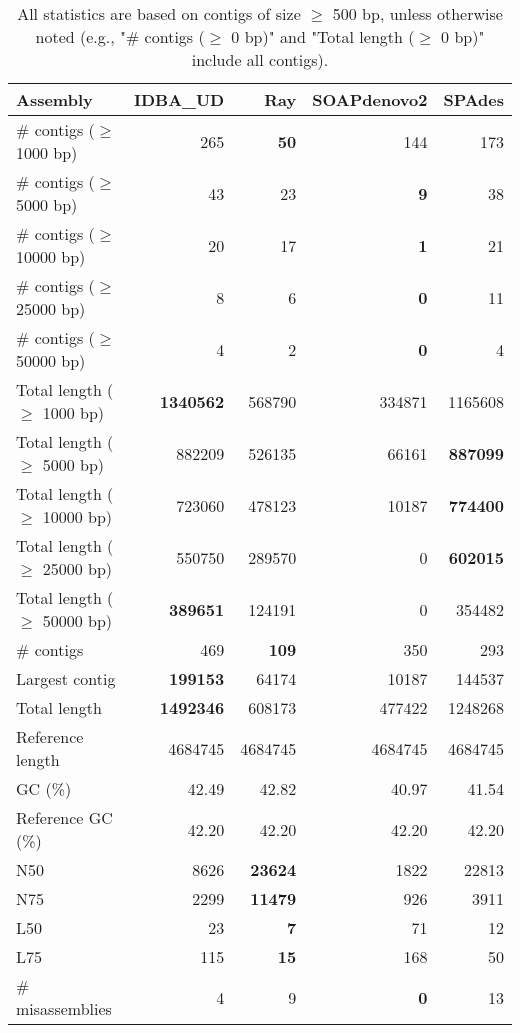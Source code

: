 \documentclass[12pt,a4paper]{article}
\begin{document}
\begin{table}[ht]
\begin{center}
\caption{All statistics are based on contigs of size $\geq$ 500 bp, unless otherwise noted (e.g., "\# contigs ($\geq$ 0 bp)" and "Total length ($\geq$ 0 bp)" include all contigs).}
\begin{tabular}{|l*{4}{|r}|}
\hline
Assembly & IDBA\_UD & Ray & SOAPdenovo2 & SPAdes \\ \hline
\# contigs ($\geq$ 1000 bp) & 265 & {\bf 50} & 144 & 173 \\ \hline
\# contigs ($\geq$ 5000 bp) & 43 & 23 & {\bf 9} & 38 \\ \hline
\# contigs ($\geq$ 10000 bp) & 20 & 17 & {\bf 1} & 21 \\ \hline
\# contigs ($\geq$ 25000 bp) & 8 & 6 & {\bf 0} & 11 \\ \hline
\# contigs ($\geq$ 50000 bp) & 4 & 2 & {\bf 0} & 4 \\ \hline
Total length ($\geq$ 1000 bp) & {\bf 1340562} & 568790 & 334871 & 1165608 \\ \hline
Total length ($\geq$ 5000 bp) & 882209 & 526135 & 66161 & {\bf 887099} \\ \hline
Total length ($\geq$ 10000 bp) & 723060 & 478123 & 10187 & {\bf 774400} \\ \hline
Total length ($\geq$ 25000 bp) & 550750 & 289570 & 0 & {\bf 602015} \\ \hline
Total length ($\geq$ 50000 bp) & {\bf 389651} & 124191 & 0 & 354482 \\ \hline
\# contigs & 469 & {\bf 109} & 350 & 293 \\ \hline
Largest contig & {\bf 199153} & 64174 & 10187 & 144537 \\ \hline
Total length & {\bf 1492346} & 608173 & 477422 & 1248268 \\ \hline
Reference length & 4684745 & 4684745 & 4684745 & 4684745 \\ \hline
GC (\%) & 42.49 & 42.82 & 40.97 & 41.54 \\ \hline
Reference GC (\%) & 42.20 & 42.20 & 42.20 & 42.20 \\ \hline
N50 & 8626 & {\bf 23624} & 1822 & 22813 \\ \hline
N75 & 2299 & {\bf 11479} & 926 & 3911 \\ \hline
L50 & 23 & {\bf 7} & 71 & 12 \\ \hline
L75 & 115 & {\bf 15} & 168 & 50 \\ \hline
\# misassemblies & 4 & 9 & {\bf 0} & 13 \\ \hline

\end{tabular}
\end{center}
\end{table}
\end{document}
